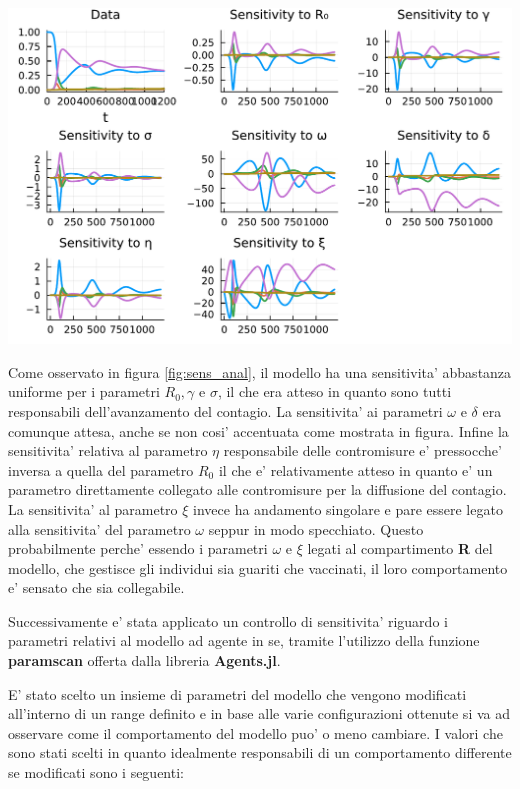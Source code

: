 \begin{minipage}{\linewidth}
	\centering
	\includegraphics[width=\textwidth]{img/sa.pdf}
	\label{fig:sens_anal}
\end{minipage}

Come osservato in figura \ref{fig:sens_anal}, il modello ha una sensitivita' abbastanza 
uniforme per i parametri $R_0, \gamma$ e $\sigma$, il che era atteso in quanto sono tutti 
responsabili dell'avanzamento del contagio. La sensitivita' ai parametri $\omega$ e $\delta$ 
era comunque attesa, anche se non cosi' accentuata come mostrata in figura. Infine la sensitivita' 
relativa al parametro $\eta$ responsabile delle contromisure e' pressocche' inversa a quella del 
parametro $R_0$ il che e' relativamente atteso in quanto e' un parametro direttamente collegato 
alle contromisure per la diffusione del contagio. La sensitivita' al parametro $\xi$ invece ha 
andamento singolare e pare essere legato alla sensitivita' del parametro $\omega$ seppur in 
modo specchiato. Questo probabilmente perche' essendo i parametri $\omega$ e $\xi$ legati al 
compartimento \textbf{R} del modello, che gestisce gli individui sia guariti che vaccinati, 
il loro comportamento e' sensato che sia collegabile.

Successivamente e' stata applicato un controllo di sensitivita' riguardo i parametri 
relativi al modello ad agente in se, tramite l'utilizzo della funzione \textbf{paramscan} offerta
dalla libreria \textbf{Agents.jl}.

E' stato scelto un insieme di parametri del modello che vengono modificati all'interno di un range 
definito e in base alle varie configurazioni ottenute si va ad osservare come il comportamento del modello 
puo' o meno cambiare. I valori che sono stati scelti in quanto idealmente responsabili di un comportamento 
differente se modificati sono i seguenti: 

